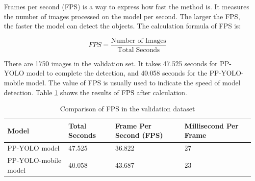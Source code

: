 \documentclass[sensors,article,submit,moreauthors,pdftex]{Definitions/mdpi}
\begin{document}
\begin{paracol}{2}
Frames per second (FPS) is a way to express how fast the method is. It measures the number of images processed on the model per second. The larger the FPS, the faster the model can detect the objects. The calculation formula of FPS is:

\begin{equation} 
{FPS} = \frac {\text{Number\ of\ Images}} {\text{Total\ Seconds}}
\end{equation}

There are 1750 images in the validation set. It takes 47.525 seconds for PP-YOLO model to complete the detection, and 40.058 seconds for the PP-YOLO-mobile model. The value of FPS is usually used to indicate the speed of model detection. Table \ref{tbl:Comparison of FPS in the validation dataset} shows the results of FPS after calculation.

\end{paracol}
\begin{table}[H]
\centering
\caption{Comparison of FPS in the validation dataset}
\begin{tabular}{llll} 
\toprule
\textbf{Model}&\textbf{Total Seconds}&\textbf{Frame Per Second (FPS)}&\textbf{Millisecond Per Frame}\\
\midrule
PP-YOLO model & 47.525&36.822&27\\
PP-YOLO-mobile model&40.058&43.687&23\\
\bottomrule
\end{tabular}
\label{tbl:Comparison of FPS in the validation dataset}
\end{table}
\end{document}
